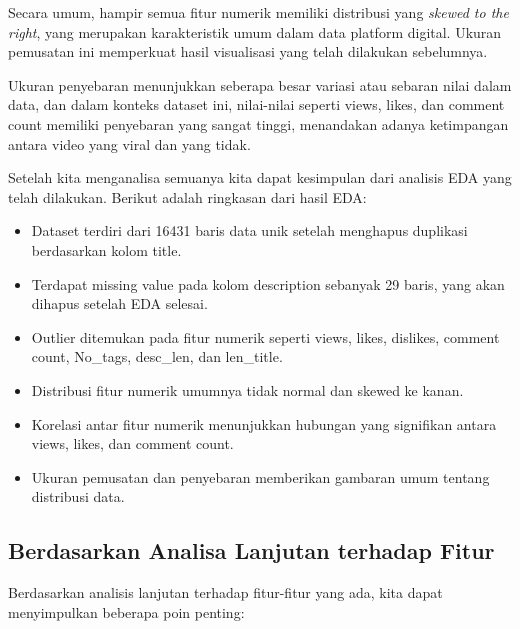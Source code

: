 Secara umum, hampir semua fitur numerik memiliki distribusi yang \textit{skewed to the right}, yang merupakan karakteristik umum dalam data platform digital. Ukuran pemusatan ini memperkuat hasil visualisasi yang telah dilakukan sebelumnya.

Ukuran penyebaran menunjukkan seberapa besar variasi atau sebaran nilai dalam data, dan dalam konteks dataset ini, nilai-nilai seperti views, likes, dan comment count memiliki penyebaran yang sangat tinggi, menandakan adanya ketimpangan antara video yang viral dan yang tidak.

Setelah kita menganalisa semuanya kita dapat kesimpulan dari analisis EDA yang telah dilakukan. Berikut adalah ringkasan dari hasil EDA:

\begin{itemize}
    \item Dataset terdiri dari 16431 baris data unik setelah menghapus duplikasi berdasarkan kolom title.
    \item Terdapat missing value pada kolom description sebanyak 29 baris, yang akan dihapus setelah EDA selesai.
    \item Outlier ditemukan pada fitur numerik seperti views, likes, dislikes, comment count, No\_tags, desc\_len, dan len\_title.
    \item Distribusi fitur numerik umumnya tidak normal dan skewed ke kanan.
    \item Korelasi antar fitur numerik menunjukkan hubungan yang signifikan antara views, likes, dan comment count.
    \item Ukuran pemusatan dan penyebaran memberikan gambaran umum tentang distribusi data.
\end{itemize}

\subsection*{Berdasarkan Analisa Lanjutan terhadap Fitur}

Berdasarkan analisis lanjutan terhadap fitur-fitur yang ada, kita dapat menyimpulkan beberapa poin penting:

